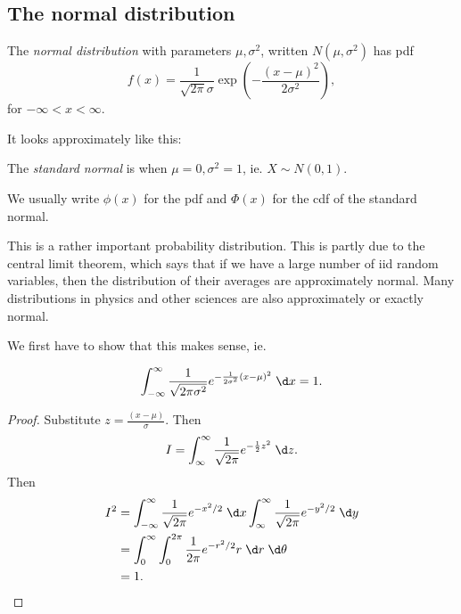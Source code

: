 \documentclass[a4paper]{article}
\begin{document}
\subsection{The normal distribution}
\begin{defi}
  The \emph{normal distribution} with parameters $\mu, \sigma^2$, written $N(\mu, \sigma^2)$ has pdf
  \[
    f(x) = \frac{1}{\sqrt{2 \pi}\sigma}\exp\left(-\frac{(x - \mu)^2}{2\sigma^2}\right),
  \]
  for $-\infty < x < \infty$.

  It looks approximately like this:
  \begin{center}
  \end{center}
  The \emph{standard normal} is when $\mu = 0, \sigma^2 = 1$, ie. $X\sim N(0, 1)$.

  We usually write $\phi(x)$ for the pdf and $\Phi(x)$ for the cdf of the standard normal.
\end{defi}
This is a rather important probability distribution. This is partly due to the central limit theorem, which says that if we have a large number of iid random variables, then the distribution of their averages are approximately normal. Many distributions in physics and other sciences are also approximately or exactly normal.

We first have to show that this makes sense, ie.
\begin{prop}
  \[
    \int_{-\infty}^\infty \frac{1}{\sqrt{2\pi \sigma^2}} e^{-\frac{1}{2\sigma^2}(x - \mu)^2}\;\d x = 1.
  \]
\end{prop}
\begin{proof}
  Substitute $z = \frac{(x - \mu)}{\sigma}$. Then
  \[
    I = \int_{\infty}^\infty \frac{1}{\sqrt{2\pi}}e^{-\frac{1}{2}z^2}\;\d z.
  \]
  Then
  \begin{align*}
    I^2 &= \int_{-\infty}^\infty \frac{1}{\sqrt{2\pi}} e^{-x^2/2}\;\d x\int_{\infty}^\infty \frac{1}{\sqrt{2\pi}} e^{-y^2/2}\;\d y\\
    &= \int_0^\infty \int_0^{2\pi}\frac{1}{2\pi}e^{-r^2/2}r\;\d r\;\d \theta\\
    &= 1.
  \end{align*}
\end{proof}
\end{document}
